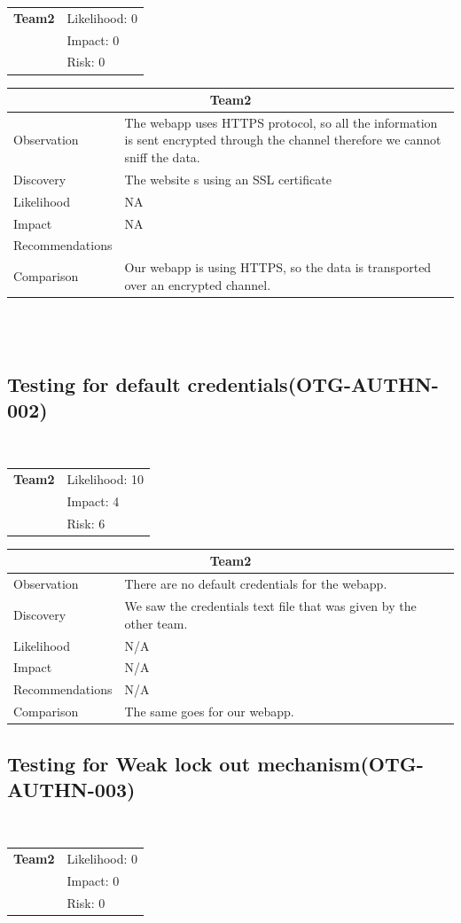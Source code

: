 \documentclass[headsepline,footsepline,footinclude=false,oneside,fontsize=11pt,paper=a4,listof=totoc,bibliography=totoc]{scrbook} %
\begin{document}
\begin{tabular}{cR{12cm}}
	\textbf{Team2} & Likelihood: 0\\& Impact: 0\\& Risk: 0
\end{tabular}

\begin{tabular}{ l|p{11cm}  }
	\hline
	\multicolumn{2}{c}{\textbf{Team2}} \\
	\hline
	Observation   & The webapp uses HTTPS protocol, so all the information is sent encrypted through the channel therefore we cannot sniff the data.\\
	Discovery  & The website s using an SSL certificate \\
	Likelihood & NA \\
	Impact    & NA\\
	Recommendations &   \\
	Comparison & Our webapp is using HTTPS, so the data is transported over an encrypted channel.\\
	\hline
\end{tabular}
\\
\vspace{0.5cm}
\\


\pagebreak
\subsection{Testing for default credentials(OTG-AUTHN-002)}\
\begin{tabular}{cR{12cm}}
	\textbf{Team2} & Likelihood: 10\\& Impact: 4\\& Risk: 6
\end{tabular}

\begin{tabular}{ l|p{11cm}  }
	\hline
	\multicolumn{2}{c}{\textbf{Team2}} \\
	\hline
	Observation   & There are no default credentials for the webapp. \\
	Discovery  & We saw the credentials text file that was given by the other team.\\
	Likelihood & N/A \\
	Impact    &  N/A \\
	Recommendations &  N/A\\
	Comparison & The same goes for our webapp.\\
	\hline
\end{tabular}
\pagebreak
\subsection{Testing for Weak lock out mechanism(OTG-AUTHN-003)}\
\begin{tabular}{cR{12cm}}
	\textbf{Team2} & Likelihood: 0\\& Impact: 0\\& Risk: 0
\end{tabular}
\end{document}
